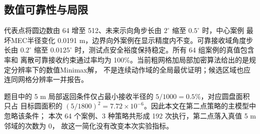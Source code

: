 \subsection{数值可靠性与局限}

代表点将圆边数由 64 增至 512、未来示向角步长由 $2^\circ$ 缩至 $0.5^\circ$ 时，中心案例
最坏MEC半径变化 0.0191 m，边界向外案例在显示精度内不变。可靠接收域角度步长由
$0.2^\circ$ 缩至 $0.0125^\circ$ 时，测试点安全裕度保持稳定。所有 64 组案例的真值包含率和
离散可靠接收约束通过率均为 100\%。当前粗网格加局部加密算法给出的是规定分辨率下的数值Minimax解，
不是连续动作域的全局最优证明；候选区域也应连同网格分辨率一并报告。

题目中的 5 m 局部返回条件仅占最小接收半径的 $5/1000=0.5\%$，对应圆盘面积只占
目标圆面积的 $(5/1800)^2=7.72\times10^{-6}$。因此本文在第二点策略的主模型中忽略该条件；
本次 64 个案例、3 种策略共形成 192 次执行，第二点落入真值 5 m 邻域的次数为 0，
故这一简化没有改变本次实验指标。
